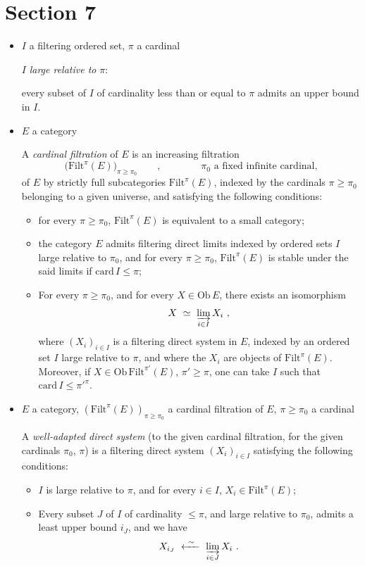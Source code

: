 \documentclass[11pt]{article}
\newcommand{\Filt}{\mathrm{Filt}}
\begin{document}
\section*{Section 7}

\begin{itemize}
\item[\textbullet] $I$ a filtering ordered set, \quad $\pi$ a cardinal

$I$ \textit{large relative to} $\pi$:

every subset of $I$ of cardinality less than or equal to $\pi$ admits an upper bound in $I$.

\item[\textbullet] $E$ a category

A \textit{cardinal filtration} of $E$ is an increasing filtration
\[
\Big(\Filt^{\pi}(E)\Big)_{\pi\geq\pi_0} \qquad , \qquad\qquad \pi_0 \text{ a fixed infinite cardinal,}
\]
of $E$ by strictly full subcategories $\Filt^{\pi}(E)$, indexed by the cardinals $\pi \geq \pi_0$ belonging to a given universe, and satisfying the following conditions:
\begin{itemize}
\item[\textit{a})] for every $\pi \geq \pi_0$, $\Filt^{\pi}(E)$ is equivalent to a small category;
\item[\textit{b})] the category $E$ admits filtering direct limits indexed by ordered sets $I$ large relative to $\pi_0$, and for every $\pi \geq \pi_0$, $\Filt^{\pi}(E)$ is stable under the said limits if $\mathrm{card}\, I \leq \pi$;
\item[\textit{c})] For every $\pi \geq \pi_0$, and for every $X \in \mathrm{Ob}\, E$, there exists an isomorphism
\[
X \ \simeq\ \varinjlim_{i\in I} X_i \ ,
\]
where $(X_i)_{i\in I}$ is a filtering direct system in $E$, indexed by an ordered set $I$ large relative to $\pi$, and where the $X_i$ are objects of $\Filt^{\pi}(E)$. Moreover, if $X \in \mathrm{Ob}\,\Filt^{\pi'}(E)$, $\pi' \geq \pi$, one can take $I$ such that $\mathrm{card}\, I \leq \pi'^{\pi}$.
\end{itemize}

\item[\textbullet] $E$ a category, \quad $(\Filt^{\pi}(E))_{\pi\geq\pi_0}$ a cardinal filtration of $E$, \quad $\pi \geq \pi_0$ a cardinal

A \textit{well-adapted direct system} (to the given cardinal filtration, for the given cardinals $\pi_0$, $\pi$) is a filtering direct system $(X_i)_{i\in I}$ satisfying the following conditions:
\begin{itemize}
\item[\textit{a})] $I$ is large relative to $\pi$, and for every $i \in I$, $X_i \in \Filt^{\pi}(E)$;
\item[\textit{b})] Every subset $J$ of $I$ of cardinality $\leq \pi$, and large relative to $\pi_0$, admits a least upper bound $i_J$, and we have
\[
X_{i_J} \ \xleftarrow{\ \sim\ }\ \varinjlim_{i\in J} X_i \ .
\]
\end{itemize}


\end{itemize}
\end{document}
